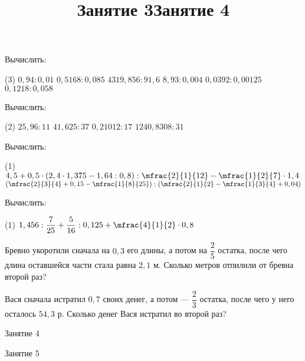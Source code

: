 \begin{class}[number=3-4]
	\title{Занятие 3}
	\begin{listofex}
		\item Вычислить:
		\begin{tasks}(3)
			\task \( 0,94: 0,01 \)
			\task \( 0,5168:0,085 \)
			\task \( 4319,856:91,6 \)
			\task \( 8,93:0,004 \)
			\task \( 0,0392:0,00125 \)
			\task \( 0,1218:0,058 \)
		\end{tasks}
		\item Вычислить:
		\begin{tasks}(2)
			\task \( 25,96:11 \)
			\task \( 41,625:37 \)
			\task \( 0,21012:17 \)
			\task \( 1240,8308:31 \)
		\end{tasks}
		\item Вычислить:\begin{tasks}(1)
			\task \( 4,5+0,5\cdot(2,4\cdot1,375-1,64:0,8):\mfrac{2}{1}{12}-\mfrac{1}{2}{7}\cdot1,4 \)
			\task \( \left( \mfrac{2}{3}{4}+0,15-\mfrac{1}{8}{25} \right):\left( \mfrac{2}{1}{2}-\mfrac{1}{3}{4}+0,04 \right) \)
		\end{tasks}
	\end{listofex}
		\title{Занятие 4}
		\begin{listofex}
		\item Вычислить:
		\begin{tasks}(1)
			\task \( 1,456:\dfrac{7}{25}+\dfrac{5}{16}:0,125+\mfrac{4}{1}{2}\cdot0,8 \)
		\end{tasks}
		\item Бревно укоротили сначала на \(0,3\) его длины, а потом на \(\dfrac{2}{5}\) остатка, после чего длина оставшейся части стала равна \(2,1\) м. Сколько метров отпилили от бревна второй раз?
		\item Вася сначала истратил \(0,7\) своих денег, а потом --- \(\dfrac{2}{3} \) остатка, после чего у него осталось \(54,3\) р. Сколько денег Вася истратил во второй раз?
	\end{listofex}
\end{class}

\begin{class}[number=4]
	\begin{listofex}
		\item Занятие 4
	\end{listofex}
\end{class}

\begin{class}[number=5]
	\begin{listofex}
		\item Занятие 5
	\end{listofex}
\end{class}

